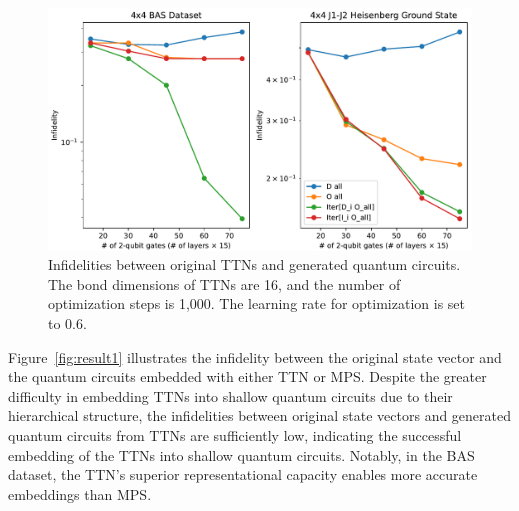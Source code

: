 \documentclass[12pt,dvipdfmx,twoside,openright]{report}
\begin{document}
  \begin{figure}
    \centering
    \includegraphics[width=\linewidth]{fig_optim_type.pdf}
    \caption{Infidelities between original TTNs and generated quantum circuits. The bond dimensions of TTNs are 16, and the number of optimization steps is 1,000. The learning rate for optimization is set to 0.6.}
    \label{fig:result2}
\end{figure}


Figure~\ref{fig:result1} illustrates the infidelity between the original state vector and the quantum circuits embedded with either TTN or MPS.
Despite the greater difficulty in embedding TTNs into shallow quantum circuits due to their hierarchical structure, the infidelities between original state vectors and generated quantum circuits from TTNs are sufficiently low, indicating the successful embedding of the TTNs into shallow quantum circuits.
Notably, in the BAS dataset, the TTN's superior representational capacity enables more accurate embeddings than MPS.
\end{document}
